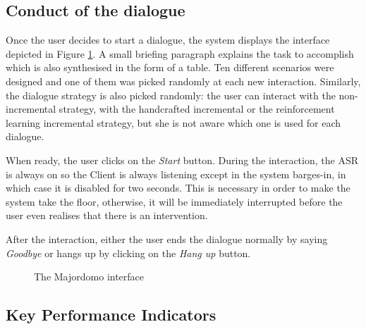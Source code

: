 	\subsection{Conduct of the dialogue}
	
		Once the user decides to start a dialogue, the system displays the interface depicted in Figure \ref{fig:majordomo}. A small briefing paragraph explains the task to accomplish which is also synthesised in the form of a table. Ten different scenarios were designed and one of them was picked randomly at each new interaction. Similarly, the dialogue strategy is also picked randomly: the user can interact with the non-incremental strategy, with the handcrafted incremental or the reinforcement learning incremental strategy, but she is not aware which one is used for each dialogue.
		
		When ready, the user clicks on the \textit{Start} button. During the interaction, the ASR is always on so the Client is always listening except in the system barges-in, in which case it is disabled for two seconds. This is necessary in order to make the system take the floor, otherwise, it will be immediately interrupted before the user even realises that there is an intervention.
		
		After the interaction, either the user ends the dialogue normally by saying \textit{Goodbye} or hangs up by clicking on the \textit{Hang up} button.
	
	\begin{figure}[htp]
		\centering
		\caption{The Majordomo interface}
		\label{fig:majordomo}
	\end{figure}
	
	\subsection{Key Performance Indicators}
	
